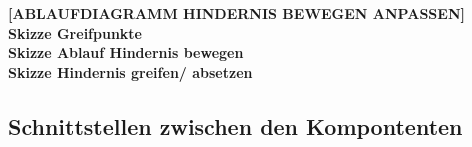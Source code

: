 \textbf{[ABLAUFDIAGRAMM HINDERNIS BEWEGEN ANPASSEN]}\\

\textbf{Skizze Greifpunkte} \\
\textbf{Skizze Ablauf Hindernis bewegen}\\
\textbf{Skizze Hindernis greifen/ absetzen}



\subsection{Schnittstellen zwischen den Kompontenten}



